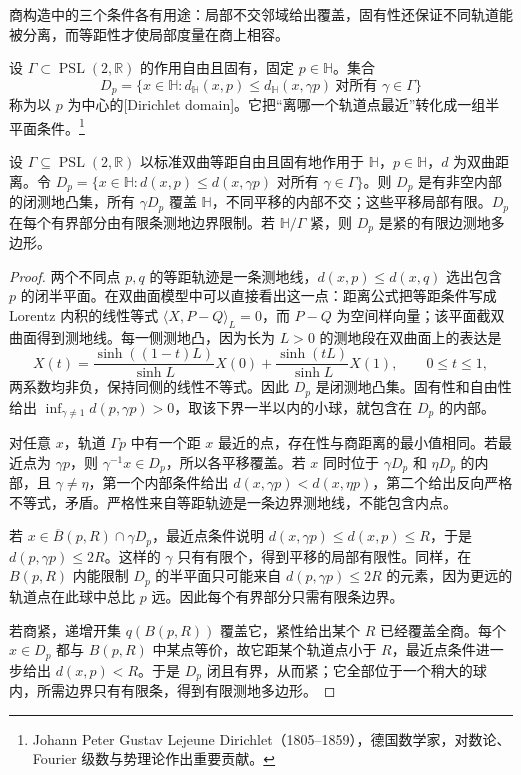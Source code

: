 商构造中的三个条件各有用途：局部不交邻域给出覆盖，固有性还保证不同轨道能被分离，而等距性才使局部度量在商上相容。

\begin{definition}\label{g1:def:dirichlet-domain}
	设 \(\Gamma\subset\operatorname{PSL}(2,\mathbb R)\) 的作用自由且固有，固定 \(p\in\mathbb H\)。集合
	\[
		D_p=\{x\in\mathbb H:d_{\mathbb H}(x,p)\le d_{\mathbb H}(x,\gamma p)\ \text{对所有 }\gamma\in\Gamma\}
	\]
	称为以 \(p\) 为中心的[Dirichlet domain]。它把“离哪一个轨道点最近”转化成一组半平面条件。\footnote{Johann Peter Gustav Lejeune Dirichlet（1805--1859），德国数学家，对数论、Fourier 级数与势理论作出重要贡献。}
\end{definition}

\begin{proposition}\label{g1:prop:dirichlet-domain}
	设 \(\Gamma\subseteq\operatorname{PSL}(2,\mathbb R)\) 以标准双曲等距自由且固有地作用于 \(\mathbb H\)，\(p\in\mathbb H\)，\(d\) 为双曲距离。令 \(D_p=\{x\in\mathbb H:d(x,p)\le d(x,\gamma p)\text{ 对所有 }\gamma\in\Gamma\}\)。则 \(D_p\) 是有非空内部的闭测地凸集，所有 \(\gamma D_p\) 覆盖 \(\mathbb H\)，不同平移的内部不交；这些平移局部有限。\(D_p\) 在每个有界部分由有限条测地边界限制。若 \(\mathbb H/\Gamma\) 紧，则 \(D_p\) 是紧的有限边测地多边形。
\end{proposition}
\begin{proof}
	两个不同点 \(p,q\) 的等距轨迹是一条测地线，\(d(x,p)\le d(x,q)\) 选出包含 \(p\) 的闭半平面。在双曲面模型中可以直接看出这一点：距离公式把等距条件写成 Lorentz 内积的线性等式 \(\langle X,P-Q\rangle_L=0\)，而 \(P-Q\) 为空间样向量；该平面截双曲面得到测地线。每一侧测地凸，因为长为 \(L>0\) 的测地段在双曲面上的表达是
	\[
		X(t)=\frac{\sinh((1-t)L)}{\sinh L}X(0)
		+\frac{\sinh(tL)}{\sinh L}X(1),\qquad 0\le t\le1,
	\]
	两系数均非负，保持同侧的线性不等式。因此 \(D_p\) 是闭测地凸集。固有性和自由性给出 \(\inf_{\gamma\ne1}d(p,\gamma p)>0\)，取该下界一半以内的小球，就包含在 \(D_p\) 的内部。

	对任意 \(x\)，轨道 \(\Gamma p\) 中有一个距 \(x\) 最近的点，存在性与商距离的最小值相同。若最近点为 \(\gamma p\)，则 \(\gamma^{-1}x\in D_p\)，所以各平移覆盖。若 \(x\) 同时位于 \(\gamma D_p\) 和 \(\eta D_p\) 的内部，且 \(\gamma\ne\eta\)，第一个内部条件给出 \(d(x,\gamma p)<d(x,\eta p)\)，第二个给出反向严格不等式，矛盾。严格性来自等距轨迹是一条边界测地线，不能包含内点。

	若 \(x\in\overline B(p,R)\cap\gamma D_p\)，最近点条件说明 \(d(x,\gamma p)\le d(x,p)\le R\)，于是 \(d(p,\gamma p)\le2R\)。这样的 \(\gamma\) 只有有限个，得到平移的局部有限性。同样，在 \(B(p,R)\) 内能限制 \(D_p\) 的半平面只可能来自 \(d(p,\gamma p)\le2R\) 的元素，因为更远的轨道点在此球中总比 \(p\) 远。因此每个有界部分只需有限条边界。

	若商紧，递增开集 \(q(B(p,R))\) 覆盖它，紧性给出某个 \(R\) 已经覆盖全商。每个 \(x\in D_p\) 都与 \(B(p,R)\) 中某点等价，故它距某个轨道点小于 \(R\)，最近点条件进一步给出 \(d(x,p)<R\)。于是 \(D_p\) 闭且有界，从而紧；它全部位于一个稍大的球内，所需边界只有有限条，得到有限测地多边形。
\end{proof}

